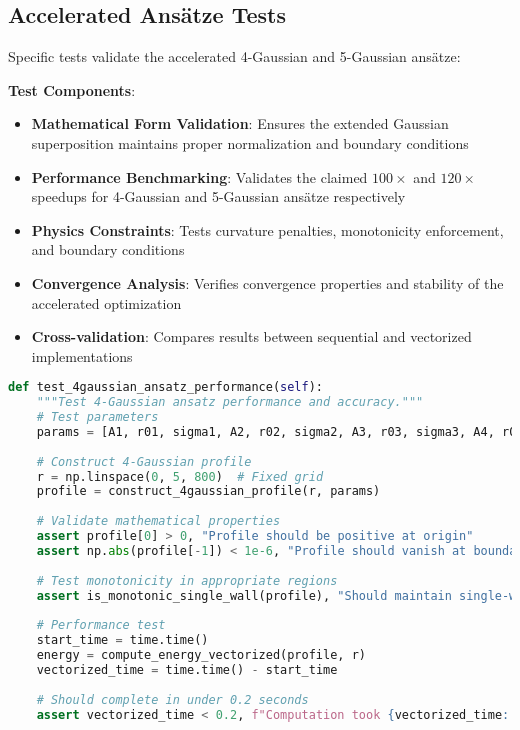 \documentclass[12pt]{article}
\begin{document}
\subsection{Accelerated Ansätze Tests}

Specific tests validate the accelerated 4-Gaussian and 5-Gaussian ansätze:

\textbf{Test Components}:
\begin{itemize}
\item \textbf{Mathematical Form Validation}: Ensures the extended Gaussian superposition maintains proper normalization and boundary conditions
\item \textbf{Performance Benchmarking}: Validates the claimed $100\times$ and $120\times$ speedups for 4-Gaussian and 5-Gaussian ansätze respectively
\item \textbf{Physics Constraints}: Tests curvature penalties, monotonicity enforcement, and boundary conditions
\item \textbf{Convergence Analysis}: Verifies convergence properties and stability of the accelerated optimization
\item \textbf{Cross-validation}: Compares results between sequential and vectorized implementations
\end{itemize}

\begin{lstlisting}[language=Python, caption=Accelerated Ansatz Test Example]
def test_4gaussian_ansatz_performance(self):
    """Test 4-Gaussian ansatz performance and accuracy."""
    # Test parameters
    params = [A1, r01, sigma1, A2, r02, sigma2, A3, r03, sigma3, A4, r04, sigma4]
    
    # Construct 4-Gaussian profile
    r = np.linspace(0, 5, 800)  # Fixed grid
    profile = construct_4gaussian_profile(r, params)
    
    # Validate mathematical properties
    assert profile[0] > 0, "Profile should be positive at origin"
    assert np.abs(profile[-1]) < 1e-6, "Profile should vanish at boundary"
    
    # Test monotonicity in appropriate regions
    assert is_monotonic_single_wall(profile), "Should maintain single-wall structure"
    
    # Performance test
    start_time = time.time()
    energy = compute_energy_vectorized(profile, r)
    vectorized_time = time.time() - start_time
    
    # Should complete in under 0.2 seconds
    assert vectorized_time < 0.2, f"Computation took {vectorized_time:.3f}s"
\end{lstlisting}
\end{document}
